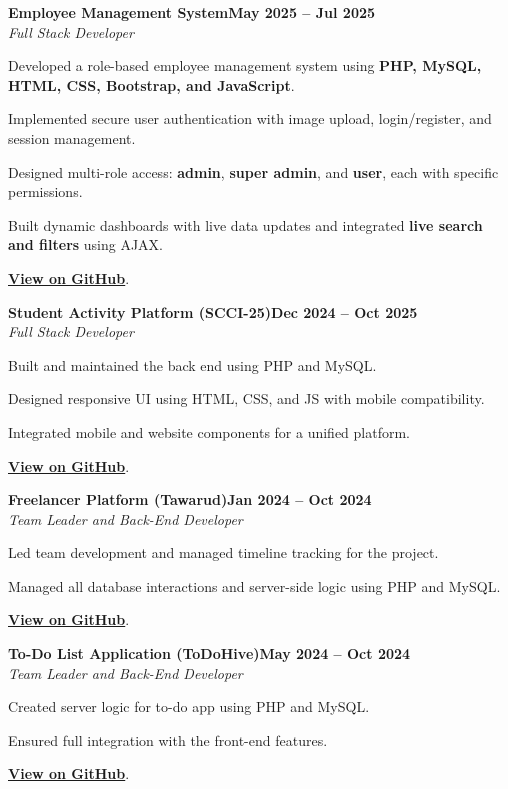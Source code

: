 \documentclass[letterpaper,10pt]{article}
\newcommand{\headingBf}[2]{\hspace{10pt}\textbf{#1}\hfill\textbf{#2}\\}
\newcommand{\headingIt}[2]{\hspace{10pt}\textit{#1}\hfill\textit{#2}\\}
\newenvironment{resume_list}{
  \vspace{-7pt}
  \begin{itemize}[itemsep=-2px, parsep=1pt, leftmargin=30pt]
}{
  \end{itemize}
}
\begin{document}
\headingBf{Employee Management System}{May 2025 -- Jul 2025}
\headingIt{Full Stack Developer}{}
\begin{resume_list}
  \item Developed a role-based employee management system using \textbf{PHP, MySQL, HTML, CSS, Bootstrap, and JavaScript}.
  \item Implemented secure user authentication with image upload, login/register, and session management.
  \item Designed multi-role access: \textbf{admin}, \textbf{super admin}, and \textbf{user}, each with specific permissions.
  \item Built dynamic dashboards with live data updates and integrated \textbf{live search and filters} using AJAX.
  \item \href{https://github.com/mahmoud530/management-system}{\textbf{View on GitHub}}.
\end{resume_list}

\headingBf{Student Activity Platform (SCCI-25)}{Dec 2024 -- Oct 2025}
\headingIt{Full Stack Developer}{}
\begin{resume_list}
  \item Built and maintained the back end using PHP and MySQL.
  \item Designed responsive UI using HTML, CSS, and JS with mobile compatibility.
  \item Integrated mobile and website components for a unified platform.
  \item \href{https://github.com/mahmoud530/SCCI-25}{\textbf{View on GitHub}}.
\end{resume_list}

\headingBf{Freelancer Platform (Tawarud)}{Jan 2024 -- Oct 2024}
\headingIt{Team Leader and Back-End Developer}{}
\begin{resume_list}
  \item Led team development and managed timeline tracking for the project.
  \item Managed all database interactions and server-side logic using PHP and MySQL.
  \item \href{https://github.com/mahmoud530/tawarud}{\textbf{View on GitHub}}.
\end{resume_list}

\headingBf{To-Do List Application (ToDoHive)}{May 2024 -- Oct 2024}
\headingIt{Team Leader and Back-End Developer}{}
\begin{resume_list}
  \item Created server logic for to-do app using PHP and MySQL.
  \item Ensured full integration with the front-end features.
  \item \href{https://github.com/mahmoud530/ToDoHive}{\textbf{View on GitHub}}.
\end{resume_list}
\end{document}
